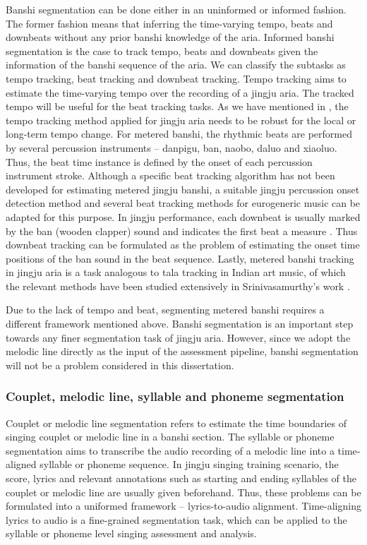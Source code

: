 Banshi segmentation can be done either in an uninformed or informed fashion. The former fashion means that inferring the time-varying tempo, beats and downbeats without any prior banshi knowledge of the aria. Informed banshi segmentation is the case to track tempo, beats and downbeats given the information of the banshi sequence of the aria. We can classify the subtasks as tempo tracking, beat tracking and downbeat tracking. Tempo tracking aims to estimate the time-varying tempo over the recording of a jingju aria. The tracked tempo will be useful for the beat tracking tasks. As we have mentioned in , the tempo tracking method applied for jingju aria needs to be robust for the local or long-term tempo change. For metered banshi, the rhythmic beats are performed by several percussion instruments -- danpigu, ban, naobo, daluo and xiaoluo. Thus, the beat time instance is defined by the onset of each percussion instrument stroke. Although a specific beat tracking algorithm has not been developed for estimating metered jingju banshi, a suitable jingju percussion onset detection method \cite{Tian2014} and several beat tracking methods \cite{Bock2011, Krebs, Bock} for eurogeneric music can be adapted for this purpose. In jingju performance, each downbeat is usually marked by the ban (wooden clapper) sound and indicates the first beat a measure \cite{Wichmann1991a}. Thus downbeat tracking can be formulated as the problem of estimating the onset time positions of the ban sound in the beat sequence. Lastly, metered banshi tracking in jingju aria is a task analogous to tala tracking in Indian art music, of which the relevant methods have been studied extensively in Srinivasamurthy's work \cite{Srinivasamurthy2016}.

Due to the lack of tempo and beat, segmenting metered banshi requires a different framework mentioned above. Banshi segmentation is an important step towards any finer segmentation task of jingju aria. However, since we adopt the melodic line directly as the input of the assessment pipeline, banshi segmentation will not be a problem considered in this dissertation.

\subsubsection{Couplet, melodic line, syllable and phoneme segmentation}

Couplet or melodic line segmentation refers to estimate the time boundaries of singing couplet or melodic line in a banshi section. The syllable or phoneme segmentation aims to transcribe the audio recording of a melodic line into a time-aligned syllable or phoneme sequence. In jingju singing training scenario, the score, lyrics and relevant annotations such as starting and ending syllables of the couplet or melodic line are usually given beforehand. Thus, these problems can be formulated into a uniformed framework -- lyrics-to-audio alignment. Time-aligning lyrics to audio is a fine-grained segmentation task, which can be applied to the syllable or phoneme level singing assessment and analysis.

